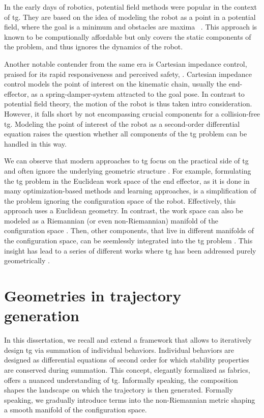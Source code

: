In the early days of robotics, potential field methods were
popular in the context of \ac{tg}.
They are based on the idea of modeling the robot as
a point in a potential field, where the goal is a minimum
and obstacles are maxima
~\cite{barraquand1992numerical,hwang1992potential}. This
approach is known to be computionally affordable but
only covers the static components of the problem, and thus
ignores the dynamics of the robot.

Another notable contender from the same era is Cartesian
impedance control, praised for its rapid responsiveness and
perceived safety, \cite{hogan1985impedance}. Cartesian
impedance control models the point of interest on the
kinematic chain, usually the end-effector, as a
spring-damper-system attracted to the goal pose. In contrast
to potential field theory, the motion of the robot is thus
taken intro consideration. However, it falls short by not
encompassing crucial components for a collision-free
\ac{tg}. Modeling the point of interest of the robot as a
second-order differential equation raises the question
whether all components of the \ac{tg} problem can be handled
in this way. 

We can observe that modern approaches to \ac{tg} focus on
the practical side of \ac{tg} and often ignore the
underlying geometric structure \cite{Ratliff2015}. For
example, formulating the \ac{tg} problem in the Euclidean
work space of the end effector, as it is done in many
optimization-based methods and learning approaches, is a
simplification of the problem ignoring the configuration
space of the robot. Effectively, this approach uses a
Euclidean geometry. In contrast, the work space can also be
modeled as a Riemannian (or even non-Riemannian) manifold of
the configuration space \cite{klein2023design}. Then, other
components, that live in different manifolds of the
configuration space, can be seemlessly integrated into the
\ac{tg} problem \cite{Ratliff2015}. This insight has lead to
a series of different works where \ac{tg} has been addressed
purely geometrically
\cite{Ratliff2015,Cheng2019,Cheng2020,Ratliff2020,Xie2020}.

\section{Geometries in trajectory generation}
\label{sec:geometries_in_trajectory_generation}

In this dissertation, we recall and extend a framework
that allows to iteratively design \ac{tg} via
summation of individual behaviors. Individual behaviors are
designed as differential equations of second order for which
stability properties are conserved during summation.
This concept, elegantly formalized as \ac{fabrics}, offers
a nuanced understanding of \ac{tg}.
Informally speaking, the composition shapes the
landscape on which the trajectory is then generated.
Formally speaking, we gradually introduce terms into the
non-Riemannian metric shaping a smooth manifold of the
configuration space.



